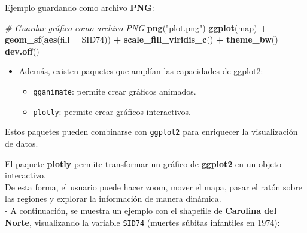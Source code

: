 \documentclass[
]{book}
\newenvironment{Shaded}{\begin{snugshade}}{\end{snugshade}}
\newcommand{\AttributeTok}[1]{\textcolor[rgb]{0.13,0.29,0.53}{#1}}
\newcommand{\CommentTok}[1]{\textcolor[rgb]{0.56,0.35,0.01}{\textit{#1}}}
\newcommand{\FunctionTok}[1]{\textcolor[rgb]{0.13,0.29,0.53}{\textbf{#1}}}
\newcommand{\NormalTok}[1]{#1}
\newcommand{\SpecialCharTok}[1]{\textcolor[rgb]{0.81,0.36,0.00}{\textbf{#1}}}
\newcommand{\StringTok}[1]{\textcolor[rgb]{0.31,0.60,0.02}{#1}}
\providecommand{\tightlist}{%
  \setlength{\itemsep}{0pt}\setlength{\parskip}{0pt}}
\begin{document}
Ejemplo guardando como archivo \textbf{PNG}:

\begin{Shaded}
\begin{Highlighting}[]
\CommentTok{\# Guardar gráfico como archivo PNG}
\FunctionTok{png}\NormalTok{(}\StringTok{"plot.png"}\NormalTok{)}
\FunctionTok{ggplot}\NormalTok{(map) }\SpecialCharTok{+} 
  \FunctionTok{geom\_sf}\NormalTok{(}\FunctionTok{aes}\NormalTok{(}\AttributeTok{fill =}\NormalTok{ SID74)) }\SpecialCharTok{+}
  \FunctionTok{scale\_fill\_viridis\_c}\NormalTok{() }\SpecialCharTok{+}
  \FunctionTok{theme\_bw}\NormalTok{()}
\FunctionTok{dev.off}\NormalTok{()   }
\end{Highlighting}
\end{Shaded}

\begin{itemize}
\item
  Además, existen paquetes que amplían las capacidades de ggplot2:

  \begin{itemize}
  \tightlist
  \item
    \texttt{gganimate}: permite crear gráficos animados.
  \item
    \texttt{plotly}: permite crear gráficos interactivos.
  \end{itemize}
\end{itemize}

Estos paquetes pueden combinarse con \texttt{ggplot2} para enriquecer la visualización de datos.

El paquete \textbf{plotly} permite transformar un gráfico de \textbf{ggplot2} en un objeto interactivo.\\
De esta forma, el usuario puede hacer zoom, mover el mapa, pasar el ratón sobre las regiones y explorar la información de manera dinámica.\\
- A continuación, se muestra un ejemplo con el shapefile de \textbf{Carolina del Norte}, visualizando la variable \texttt{SID74} (muertes súbitas infantiles en 1974):
\end{document}
